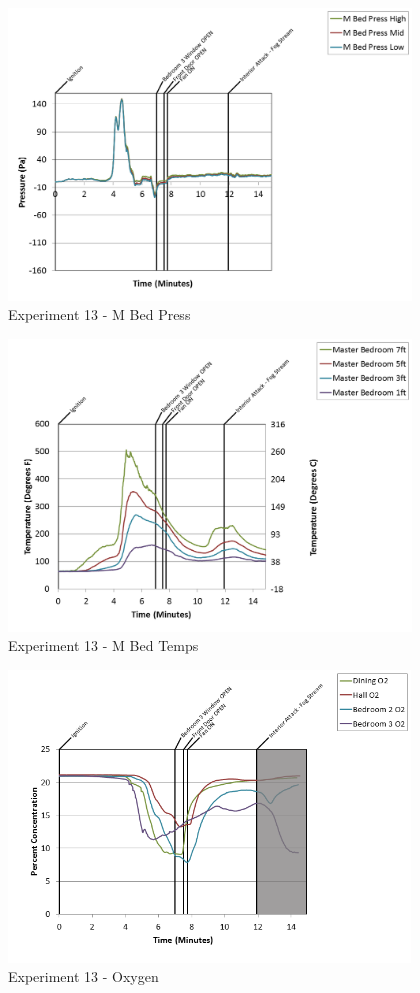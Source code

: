 \documentclass{article}
\begin{document}
\begin{appendices}
\begin{figure}[h!]
	\centering
	\includegraphics[height=3.05in]{0_Images/Results_Charts/Exp_13_Charts/MBedPress.png}
	\caption{Experiment 13 - M Bed Press}
\end{figure}

\clearpage

\begin{figure}[h!]
	\centering
	\includegraphics[height=3.05in]{0_Images/Results_Charts/Exp_13_Charts/MBedTemps.png}
	\caption{Experiment 13 - M Bed Temps}
\end{figure}


\begin{figure}[h!]
	\centering
	\includegraphics[height=3.05in]{0_Images/Results_Charts/Exp_13_Charts/Oxygen.png}
	\caption{Experiment 13 - Oxygen}
\end{figure}


\end{appendices}
\end{document}
